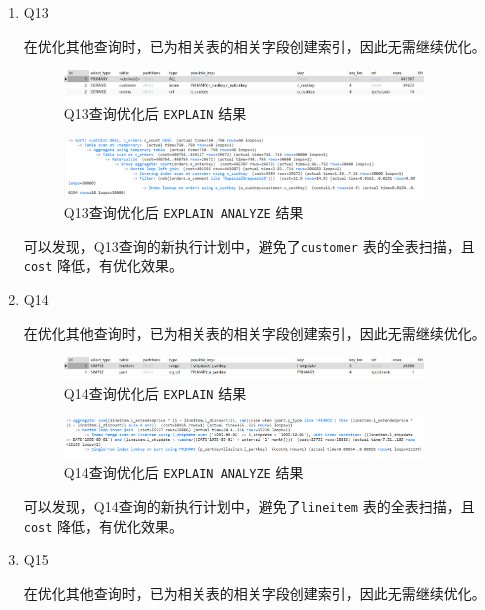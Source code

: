 \documentclass{article}
\renewcommand\tt{\texttt}
\begin{document}
\begin{enumerate}
  \item Q13
  
在优化其他查询时，已为相关表的相关字段创建索引，因此无需继续优化。

\begin{figure}[H]
\centering
\includegraphics[width=0.9\textwidth]{img/69.png}
\caption{Q13查询优化后 \tt{EXPLAIN} 结果}
\end{figure}

\begin{figure}[H]
\centering
\includegraphics[width=0.9\textwidth]{img/70.png}
\caption{Q13查询优化后 \tt{EXPLAIN ANALYZE} 结果}
\end{figure}

可以发现，Q13查询的新执行计划中，避免了\tt{customer} 表的全表扫描，且 \tt{cost} 降低，有优化效果。

  \item Q14
  
在优化其他查询时，已为相关表的相关字段创建索引，因此无需继续优化。

\begin{figure}[H]
\centering
\includegraphics[width=0.9\textwidth]{img/71.png}
\caption{Q14查询优化后 \tt{EXPLAIN} 结果}
\end{figure}

\begin{figure}[H]
\centering
\includegraphics[width=0.9\textwidth]{img/72.png}
\caption{Q14查询优化后 \tt{EXPLAIN ANALYZE} 结果}
\end{figure}

可以发现，Q14查询的新执行计划中，避免了\tt{lineitem} 表的全表扫描，且 \tt{cost} 降低，有优化效果。

  \item Q15
  
在优化其他查询时，已为相关表的相关字段创建索引，因此无需继续优化。


\end{enumerate}
\end{document}

